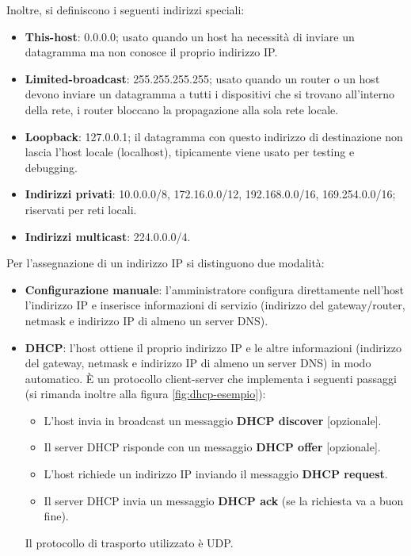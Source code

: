 \documentclass[11pt, italian, openany]{book}
\begin{document}
\begin{sloppypar}
Inoltre, si definiscono i seguenti indirizzi speciali:
\begin{itemize}[itemsep=0pt, topsep=0pt, parsep=0pt]
	\item \textbf{This-host}: 0.0.0.0; usato quando un host ha necessit\`a di inviare un datagramma ma non conosce il proprio indirizzo IP.
	\item \textbf{Limited-broadcast}: 255.255.255.255; usato quando un router o un host devono inviare un datagramma a tutti i dispositivi che si trovano
	all’interno della rete, i router bloccano la propagazione alla sola rete locale.
	\item \textbf{Loopback}: 127.0.0.1; il datagramma con questo indirizzo di destinazione non lascia l’host locale (localhost), tipicamente viene usato per
	testing e debugging.
	\item \textbf{Indirizzi privati}: 10.0.0.0/8, 172.16.0.0/12, 192.168.0.0/16, 169.254.0.0/16; riservati per reti locali.
	\item \textbf{Indirizzi multicast}: 224.0.0.0/4.
\end{itemize}

Per l'assegnazione di un indirizzo IP si distinguono due modalit\`a:
\begin{itemize}[itemsep=0pt, parsep=0pt, topsep=0pt]
	\item \textbf{Configurazione manuale}: l'amministratore configura direttamente nell'host l'indirizzo IP e inserisce informazioni di servizio (indirizzo
	del gateway/router, netmask e indirizzo IP di almeno un server DNS).
	\item \textbf{DHCP}: l'host ottiene il proprio indirizzo IP e le altre informazioni (indirizzo del gateway, netmask e indirizzo IP di almeno un server DNS)
	in modo automatico. \`E un protocollo client-server che implementa i seguenti passaggi (si rimanda inoltre alla figura \ref{fig:dhcp-esempio}):
	\begin{itemize}
		\item L’host invia in broadcast un messaggio \textbf{DHCP discover} [opzionale].
		\item Il server DHCP risponde con un messaggio \textbf{DHCP offer} [opzionale].
		\item L’host richiede un indirizzo IP inviando il messaggio \textbf{DHCP request}.
		\item Il server DHCP invia un messaggio \textbf{DHCP ack} (se la richiesta va a buon fine).
	\end{itemize}
	Il protocollo di trasporto utilizzato \`e UDP.
\end{itemize}


\end{sloppypar}
\end{document}

